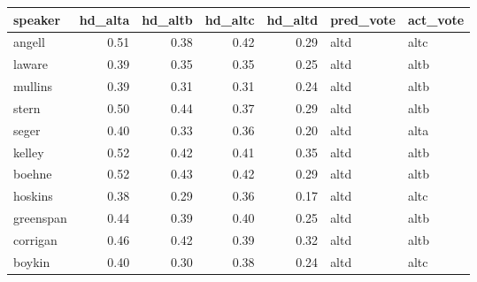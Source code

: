 \begin{tabular}{lrrrrll}
\toprule
   speaker &  hd\_alta &  hd\_altb &  hd\_altc &  hd\_altd & pred\_vote & act\_vote \\
\midrule
    angell &     0.51 &     0.38 &     0.42 &     0.29 &      altd &     altc \\
    laware &     0.39 &     0.35 &     0.35 &     0.25 &      altd &     altb \\
   mullins &     0.39 &     0.31 &     0.31 &     0.24 &      altd &     altb \\
     stern &     0.50 &     0.44 &     0.37 &     0.29 &      altd &     altb \\
     seger &     0.40 &     0.33 &     0.36 &     0.20 &      altd &     alta \\
    kelley &     0.52 &     0.42 &     0.41 &     0.35 &      altd &     altb \\
    boehne &     0.52 &     0.43 &     0.42 &     0.29 &      altd &     altb \\
   hoskins &     0.38 &     0.29 &     0.36 &     0.17 &      altd &     altc \\
 greenspan &     0.44 &     0.39 &     0.40 &     0.25 &      altd &     altb \\
  corrigan &     0.46 &     0.42 &     0.39 &     0.32 &      altd &     altb \\
    boykin &     0.40 &     0.30 &     0.38 &     0.24 &      altd &     altc \\
\bottomrule
\end{tabular}
